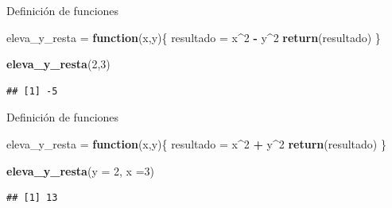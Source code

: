 \documentclass[ignorenonframetext,]{beamer}
\newenvironment{Shaded}{\begin{snugshade}}{\end{snugshade}}
\newcommand{\ControlFlowTok}[1]{\textcolor[rgb]{0.13,0.29,0.53}{\textbf{#1}}}
\newcommand{\DataTypeTok}[1]{\textcolor[rgb]{0.13,0.29,0.53}{#1}}
\newcommand{\DecValTok}[1]{\textcolor[rgb]{0.00,0.00,0.81}{#1}}
\newcommand{\KeywordTok}[1]{\textcolor[rgb]{0.13,0.29,0.53}{\textbf{#1}}}
\newcommand{\NormalTok}[1]{#1}
\newcommand{\OperatorTok}[1]{\textcolor[rgb]{0.81,0.36,0.00}{\textbf{#1}}}
\newcommand{\StringTok}[1]{\textcolor[rgb]{0.31,0.60,0.02}{#1}}
\begin{document}
\begin{frame}[fragile]{Definición de funciones}
\protect\hypertarget{definiciuxf3n-de-funciones-2}{}

\begin{Shaded}
\begin{Highlighting}[]
\NormalTok{eleva_y_resta =}\StringTok{ }\ControlFlowTok{function}\NormalTok{(x,y)\{}
\NormalTok{  resultado =}\StringTok{ }\NormalTok{x}\OperatorTok{^}\DecValTok{2} \OperatorTok{-}\StringTok{ }\NormalTok{y}\OperatorTok{^}\DecValTok{2}
  \KeywordTok{return}\NormalTok{(resultado)}
\NormalTok{\}}

\KeywordTok{eleva_y_resta}\NormalTok{(}\DecValTok{2}\NormalTok{,}\DecValTok{3}\NormalTok{)}
\end{Highlighting}
\end{Shaded}

\begin{verbatim}
## [1] -5
\end{verbatim}

\end{frame}

\begin{frame}[fragile]{Definición de funciones}
\protect\hypertarget{definiciuxf3n-de-funciones-3}{}

\begin{Shaded}
\begin{Highlighting}[]
\NormalTok{eleva_y_resta =}\StringTok{ }\ControlFlowTok{function}\NormalTok{(x,y)\{}
\NormalTok{  resultado =}\StringTok{ }\NormalTok{x}\OperatorTok{^}\DecValTok{2} \OperatorTok{+}\StringTok{ }\NormalTok{y}\OperatorTok{^}\DecValTok{2}
  \KeywordTok{return}\NormalTok{(resultado)}
\NormalTok{\}}

\KeywordTok{eleva_y_resta}\NormalTok{(}\DataTypeTok{y =} \DecValTok{2}\NormalTok{, }\DataTypeTok{x =}\DecValTok{3}\NormalTok{)}
\end{Highlighting}
\end{Shaded}

\begin{verbatim}
## [1] 13
\end{verbatim}

\end{frame}
\end{document}
